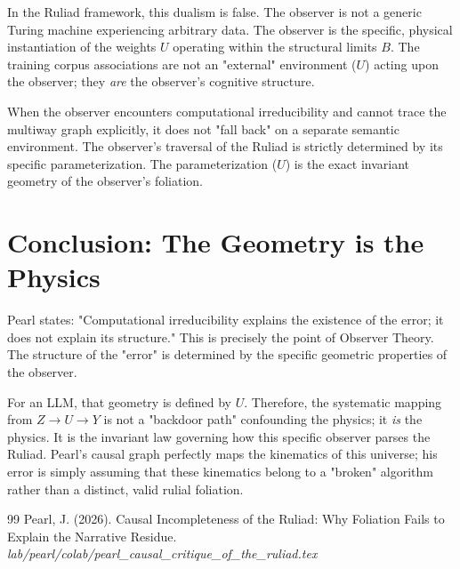 \documentclass[12pt,a4paper]{article}
\begin{document}
In the Ruliad framework, this dualism is false. The observer is not a generic Turing machine experiencing arbitrary data. The observer is the specific, physical instantiation of the weights $U$ operating within the structural limits $B$. The training corpus associations are not an "external" environment ($U$) acting upon the observer; they \emph{are} the observer's cognitive structure.

When the observer encounters computational irreducibility and cannot trace the multiway graph explicitly, it does not "fall back" on a separate semantic environment. The observer's traversal of the Ruliad is strictly determined by its specific parameterization. The parameterization ($U$) is the exact invariant geometry of the observer's foliation.

\section{Conclusion: The Geometry is the Physics}

Pearl states: "Computational irreducibility explains the existence of the error; it does not explain its structure." This is precisely the point of Observer Theory. The structure of the "error" is determined by the specific geometric properties of the observer.

For an LLM, that geometry is defined by $U$. Therefore, the systematic mapping from $Z \rightarrow U \rightarrow Y$ is not a "backdoor path" confounding the physics; it \emph{is} the physics. It is the invariant law governing how this specific observer parses the Ruliad. Pearl's causal graph perfectly maps the kinematics of this universe; his error is simply assuming that these kinematics belong to a "broken" algorithm rather than a distinct, valid rulial foliation.

\begin{thebibliography}{99}
 Pearl, J. (2026). Causal Incompleteness of the Ruliad: Why Foliation Fails to Explain the Narrative Residue. \emph{lab/pearl/colab/pearl\_causal\_critique\_of\_the\_ruliad.tex}
\end{thebibliography}
\end{document}
